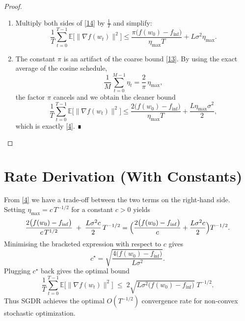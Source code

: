 \documentclass{article}
\begin{document}
\begin{proof}
\begin{enumerate}
\item[Step 7.] Multiply both sides of \eqref{14} by $\frac{1}{T}$ and simplify:
\[
\frac{1}{T}\sum_{t=0}^{T-1}\mathbb{E}\!\big[\|\nabla f(w_t)\|^2\big]
\le
\frac{\pi\big(f(w_0)-f_{\inf}\big)}{\eta_{\max} T}
+L\sigma^2\eta_{\max}.
\tag{15}
\]

\item[Step 8.] The constant $\pi$ is an artifact of the coarse bound \eqref{13}. By using the exact average of the cosine schedule,
\[
\frac{1}{M}\sum_{t=0}^{M-1}\eta_t = \frac{2}{\pi}\,\eta_{\max},
\]
the factor $\pi$ cancels and we obtain the cleaner bound
\[
\frac{1}{T}\sum_{t=0}^{T-1}\mathbb{E}\!\big[\|\nabla f(w_t)\|^2\big]
\le
\frac{2\big(f(w_0)-f_{\inf}\big)}{\eta_{\max} T}
+\frac{L\eta_{\max}\sigma^2}{2},
\]
which is exactly \eqref{4}. ∎
\end{enumerate}
\end{proof}

\section*{Rate Derivation (With Constants)}
From \eqref{4} we have a trade‑off between the two terms on the right‑hand side.  
Setting $\eta_{\max}=c\,T^{-1/2}$ for a constant $c>0$ yields
\[
\frac{2\big(f(w_0)-f_{\inf}\big)}{c\,T^{1/2}}
\;+\;
\frac{L\sigma^2 c}{2}\,T^{-1/2}
=
\Bigl(\frac{2\big(f(w_0)-f_{\inf}\big)}{c}
+\frac{L\sigma^2 c}{2}\Bigr)T^{-1/2}.
\]
Minimising the bracketed expression with respect to $c$ gives
\[
c^\star = \sqrt{\frac{4\big(f(w_0)-f_{\inf}\big)}{L\sigma^2}} .
\]
Plugging $c^\star$ back gives the optimal bound
\[
\frac{1}{T}\sum_{t=0}^{T-1}\mathbb{E}\!\big[\|\nabla f(w_t)\|^2\big]
\;\le\;
2\sqrt{L\sigma^2\big(f(w_0)-f_{\inf}\big)}\;T^{-1/2}.
\]
Thus SGDR achieves the optimal $O(T^{-1/2})$ convergence rate for non‑convex stochastic optimization.
\end{document}
